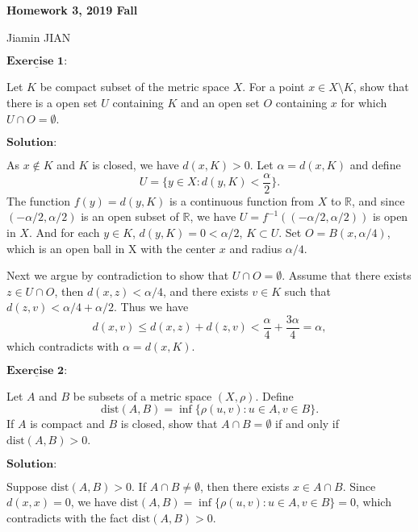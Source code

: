 \documentclass[12pt,a4paper]{ctexart}
\begin{document}
\begin{center}
\textbf{ Homework 3, 2019 Fall}
\vspace{8pt}

Jiamin JIAN
\end{center}

\vspace{12pt}

$\underline{\textbf{Exercise 1:}}$

Let $K$ be compact subset of the metric space $X$. For a point $x \in X \setminus K$, show that there is a open set $U$ containing $K$ and an open set $O$ containing $x$ for which $U \cap O = \emptyset$.
 
 
\vspace{8pt}
$\textbf{Solution:}$

As $x \notin K$ and $K$ is closed, we have $d(x, K)  > 0$. Let $\alpha = d(x, K)$ and define 
$$ U = \{y \in X: d(y, K) < \frac{\alpha}{2}\}.$$
The function $f(y) = d(y, K)$ is a continuous function from $X$ to $\mathbb R$, and since $(- \alpha/2, \alpha/2)$ is an open subset of $\mathbb R$, we have $U = f^{-1}((- \alpha/2, \alpha/2))$ is open in $X$. And for each $y \in K$, $d(y, K) = 0 < \alpha/2$, $K \subset U$. Set $O = B(x, \alpha/4)$, which is an open ball in X with the center $x$ and radius $\alpha/4$. 

Next we argue by contradiction to show that $U \cap O = \emptyset$. Assume that there exists $z \in U \cap O$, then $d(x, z) < \alpha/4$, and there exists $v \in K$ such that $d(z, v) < \alpha/4 + \alpha/2$. Thus we have
$$d(x, v) \leq d(x, z) + d(z, v) < \frac{\alpha}{4} + \frac{3 \alpha}{4} = \alpha,$$
which contradicts with $\alpha = d(x, K)$.


\vspace{8pt}

$\underline{\textbf{Exercise 2:}}$

Let $A$ and $B$ be subsets of a metric space $(X, \rho)$. Define 
$$\text{dist} (A, B) = \inf \{\rho(u, v): u \in A, v \in B \}.$$
If $A$ is compact and $B$ is closed, show that $A \cap B = \emptyset$ if and only if $\text{dist} (A, B) > 0$. 
 
\vspace{8pt}
$\textbf{Solution:}$

Suppose $\text{dist} (A, B) > 0$. If $A \cap B \neq \emptyset$, then there exists $x \in A \cap B$. Since $d(x, x) = 0$, we have $\text{dist} (A, B) = \inf \{\rho(u, v): u \in A, v \in B \} = 0$, which contradicts with the fact $\text{dist} (A, B) > 0$.
\end{document}
